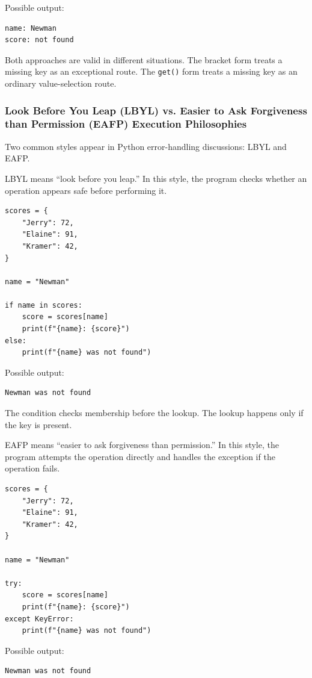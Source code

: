 \documentclass[a4paper,twoside]{report}
\begin{document}
Possible output:

\begin{verbatim}
name: Newman
score: not found
\end{verbatim}

Both approaches are valid in different situations. The bracket form treats a missing key as an exceptional route. The \texttt{get()} form treats a missing key as an ordinary value-selection route.

\subsubsection{Look Before You Leap (LBYL) vs. Easier to Ask Forgiveness than Permission (EAFP) Execution Philosophies}

Two common styles appear in Python error-handling discussions: LBYL and EAFP.

LBYL means ``look before you leap.'' In this style, the program checks whether an operation appears safe before performing it.

\begin{verbatim}
scores = {
    "Jerry": 72,
    "Elaine": 91,
    "Kramer": 42,
}

name = "Newman"

if name in scores:
    score = scores[name]
    print(f"{name}: {score}")
else:
    print(f"{name} was not found")
\end{verbatim}

Possible output:

\begin{verbatim}
Newman was not found
\end{verbatim}

The condition checks membership before the lookup. The lookup happens only if the key is present.

EAFP means ``easier to ask forgiveness than permission.'' In this style, the program attempts the operation directly and handles the exception if the operation fails.

\begin{verbatim}
scores = {
    "Jerry": 72,
    "Elaine": 91,
    "Kramer": 42,
}

name = "Newman"

try:
    score = scores[name]
    print(f"{name}: {score}")
except KeyError:
    print(f"{name} was not found")
\end{verbatim}

Possible output:

\begin{verbatim}
Newman was not found
\end{verbatim}
\end{document}
